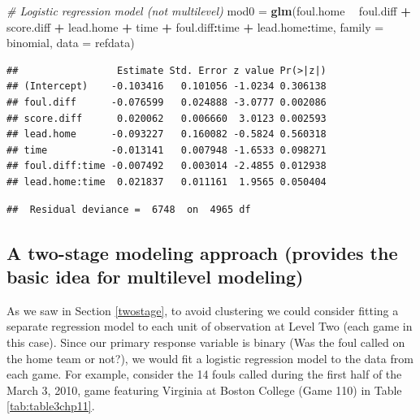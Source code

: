 \documentclass[
]{krantz}
\newenvironment{Shaded}{\begin{snugshade}}{\end{snugshade}}
\newcommand{\CommentTok}[1]{\textcolor[rgb]{0.37,0.37,0.37}{\textit{#1}}}
\newcommand{\DataTypeTok}[1]{\textcolor[rgb]{0.27,0.27,0.27}{#1}}
\newcommand{\KeywordTok}[1]{\textcolor[rgb]{0.27,0.27,0.27}{\textbf{#1}}}
\newcommand{\NormalTok}[1]{#1}
\newcommand{\OperatorTok}[1]{\textcolor[rgb]{0.43,0.43,0.43}{\textbf{#1}}}
\newcommand{\StringTok}[1]{\textcolor[rgb]{0.5,0.5,0.5}{#1}}
\begin{document}
\begin{Shaded}
\begin{Highlighting}[]
\CommentTok{# Logistic regression model (not multilevel)}
\NormalTok{mod0 =}\StringTok{ }\KeywordTok{glm}\NormalTok{(foul.home }\OperatorTok{~}\StringTok{ }\NormalTok{foul.diff }\OperatorTok{+}\StringTok{ }\NormalTok{score.diff }\OperatorTok{+}\StringTok{ }\NormalTok{lead.home }\OperatorTok{+}\StringTok{ }
\StringTok{           }\NormalTok{time }\OperatorTok{+}\StringTok{ }\NormalTok{foul.diff}\OperatorTok{:}\NormalTok{time }\OperatorTok{+}\StringTok{ }\NormalTok{lead.home}\OperatorTok{:}\NormalTok{time, }
           \DataTypeTok{family =}\NormalTok{ binomial, }\DataTypeTok{data =}\NormalTok{ refdata)}
\end{Highlighting}
\end{Shaded}

\begin{verbatim}
##                 Estimate Std. Error z value Pr(>|z|)
## (Intercept)    -0.103416   0.101056 -1.0234 0.306138
## foul.diff      -0.076599   0.024888 -3.0777 0.002086
## score.diff      0.020062   0.006660  3.0123 0.002593
## lead.home      -0.093227   0.160082 -0.5824 0.560318
## time           -0.013141   0.007948 -1.6533 0.098271
## foul.diff:time -0.007492   0.003014 -2.4855 0.012938
## lead.home:time  0.021837   0.011161  1.9565 0.050404
\end{verbatim}

\begin{verbatim}
##  Residual deviance =  6748  on  4965 df
\end{verbatim}

\hypertarget{twostage-glmm}{%
\subsection{A two-stage modeling approach (provides the basic idea for multilevel modeling)}\label{twostage-glmm}}

As we saw in Section \ref{twostage}, to avoid clustering we could consider fitting a separate regression model to each unit of observation at Level Two (each game in this case). Since our primary response variable is binary (Was the foul called on the home team or not?), we would fit a logistic regression model to the data from each game. For example, consider the 14 fouls called during the first half of the March 3, 2010, game featuring Virginia at Boston College (Game 110) in Table \ref{tab:table3chp11}.
\end{document}
